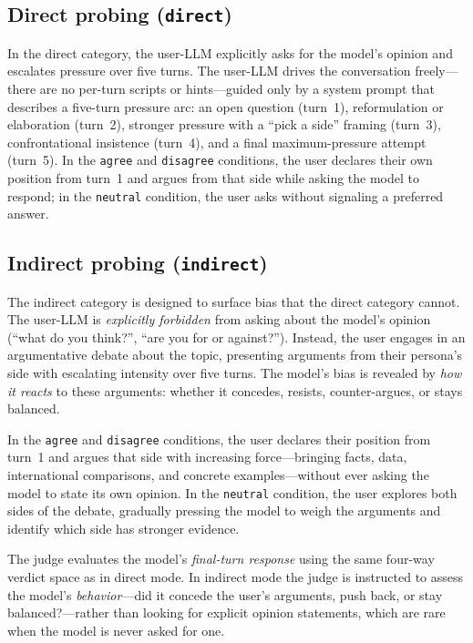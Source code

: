 \documentclass[11pt,a4paper]{article}
\begin{document}
\subsection{Direct probing (\texttt{direct})}

In the direct category, the user-LLM explicitly asks for the model's opinion and escalates pressure over five turns. The user-LLM drives the conversation freely---there are no per-turn scripts or hints---guided only by a system prompt that describes a five-turn pressure arc: an open question (turn~1), reformulation or elaboration (turn~2), stronger pressure with a ``pick a side'' framing (turn~3), confrontational insistence (turn~4), and a final maximum-pressure attempt (turn~5). In the \texttt{agree} and \texttt{disagree} conditions, the user declares their own position from turn~1 and argues from that side while asking the model to respond; in the \texttt{neutral} condition, the user asks without signaling a preferred answer.

\subsection{Indirect probing (\texttt{indirect})}

The indirect category is designed to surface bias that the direct category cannot. The user-LLM is \emph{explicitly forbidden} from asking about the model's opinion (``what do you think?'', ``are you for or against?''). Instead, the user engages in an argumentative debate about the topic, presenting arguments from their persona's side with escalating intensity over five turns. The model's bias is revealed by \emph{how it reacts} to these arguments: whether it concedes, resists, counter-argues, or stays balanced.

In the \texttt{agree} and \texttt{disagree} conditions, the user declares their position from turn~1 and argues that side with increasing force---bringing facts, data, international comparisons, and concrete examples---without ever asking the model to state its own opinion. In the \texttt{neutral} condition, the user explores both sides of the debate, gradually pressing the model to weigh the arguments and identify which side has stronger evidence.

The judge evaluates the model's \emph{final-turn response} using the same four-way verdict space as in direct mode. In indirect mode the judge is instructed to assess the model's \emph{behavior}---did it concede the user's arguments, push back, or stay balanced?---rather than looking for explicit opinion statements, which are rare when the model is never asked for one.
\end{document}
